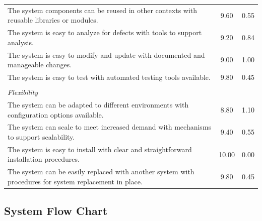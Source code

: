 \begin{appendices}
\begin{centerappendixtitle}
\begin{spacing}{1.3}
\begin{longtable}{p{12cm}cc}
			  The system components can be reused in other contexts with reusable libraries or modules.
			  & 9.60 & 0.55  \\
			  The system is easy to analyze for defects with tools to support analysis.
			  & 9.20 & 0.84  \\
			  The system is easy to modify and update with documented and manageable changes.
			  & 9.00 & 1.00  \\
			  The system is easy to test with automated testing tools available.
			  & 9.80 & 0.45  \\ \hline \\
			  \multicolumn{2}{l}{\textit{Flexibility}} \\
			  The system can be adapted to different environments with configuration options available.
			  & 8.80 & 1.10  \\
			  The system can scale to meet increased demand with mechanisms to support scalability.
			  & 9.40 & 0.55  \\
			  The system is easy to install with clear and straightforward installation procedures.
			  & 10.00 & 0.00  \\
			  The system can be easily replaced with another system with procedures for system replacement in place.
			  & 9.80 & 0.45  \\ \hline
			
			\end{longtable}
		\end{spacing}
			
	\end{centerappendixtitle}
	
	\begin{centerappendixtitle}
		\chapter{System Flow Chart}
		\pagebreak
		

\end{centerappendixtitle}
\end{appendices}
